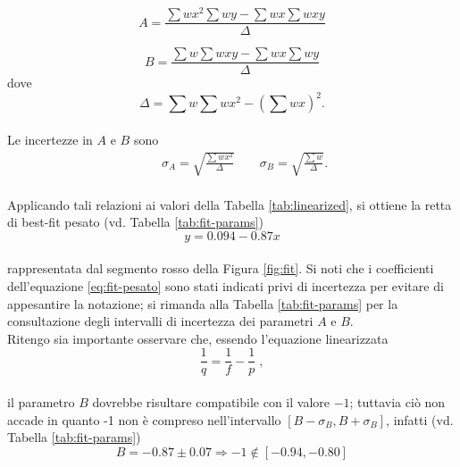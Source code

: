 \documentclass[11pt,a4paper]{article}
\begin{document}
\begin{equation}
    A=\frac{\sum w x^2 \sum w y-\sum w x \sum w x y}{\Delta}
    \tag{8.37}
\end{equation}


\begin{equation}
    B=\frac{\sum w \sum w x y-\sum w x \sum w y}{\Delta}
    \tag{8.38}
\end{equation}
dove
\begin{equation}
    \Delta=\sum w \sum w x^2-\left(\sum w x\right)^2.
    \tag{8.39}
\end{equation}
\\
Le incertezze in $A$ e $B$ sono
\begin{equation}
    \begin{gathered}
        \qquad{\sigma_A=\sqrt{\frac{\sum w x^2}{\Delta}}}
        \qquad{\sigma_B=\sqrt{\frac{\sum w}{\Delta}}}.
    \end{gathered}
\end{equation}
\\
Applicando tali relazioni ai valori della Tabella \ref{tab:linearized}, si ottiene la retta di best-fit pesato (vd. Tabella \ref{tab:fit-params})
\\
\begin{equation}
    y = 0.094 - 0.87 x
    \label{eq:fit-pesato}
\end{equation}
\\
rappresentata dal segmento rosso della Figura \ref{fig:fit}. Si noti che i coefficienti dell'equazione \ref{eq:fit-pesato} sono stati indicati privi di incertezza per evitare di appesantire la notazione; si rimanda alla Tabella \ref{tab:fit-params} per la consultazione degli intervalli di incertezza dei parametri $A$ e $B$.
\\
Ritengo sia importante osservare che, essendo l'equazione linearizzata
\\
\begin{equation}
    \frac{1}{q} = \frac{1}{f} - \frac{1}{p} \; ,
\end{equation}
\\
il parametro $B$ dovrebbe risultare compatibile con il valore $-1$; tuttavia ciò non accade in quanto -1 non è compreso nell'intervallo $[B - \sigma_B, B + \sigma_B]$, infatti (vd. Tabella \ref{tab:fit-params})
\\
\begin{equation}
    B = -0.87 \pm 0.07 \Longrightarrow -1 \notin [-0.94,-0.80]
\end{equation}
\\
\end{document}
